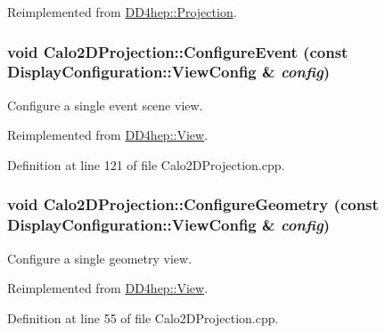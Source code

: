Reimplemented from \hyperlink{class_d_d4hep_1_1_projection_a32d78dc00500fcb000ce25052c96fd62}{DD4hep::Projection}.\hypertarget{class_d_d4hep_1_1_calo2_d_projection_ab49fa4071160750bd2c82e68b2f6d524}{
\subsubsection[{ConfigureEvent}]{\setlength{\rightskip}{0pt plus 5cm}void Calo2DProjection::ConfigureEvent (const {\bf DisplayConfiguration::ViewConfig} \& {\em config})}}
\label{class_d_d4hep_1_1_calo2_d_projection_ab49fa4071160750bd2c82e68b2f6d524}


Configure a single event scene view. 

Reimplemented from \hyperlink{class_d_d4hep_1_1_view_a655dc004a93ab9caa56ee5a501bf492f}{DD4hep::View}.

Definition at line 121 of file Calo2DProjection.cpp.\hypertarget{class_d_d4hep_1_1_calo2_d_projection_aabf1a03b64b1baad596aaa9349e3cbea}{
\subsubsection[{ConfigureGeometry}]{\setlength{\rightskip}{0pt plus 5cm}void Calo2DProjection::ConfigureGeometry (const {\bf DisplayConfiguration::ViewConfig} \& {\em config})}}
\label{class_d_d4hep_1_1_calo2_d_projection_aabf1a03b64b1baad596aaa9349e3cbea}


Configure a single geometry view. 

Reimplemented from \hyperlink{class_d_d4hep_1_1_view_adefb4cb817819ec62803d34b89bf0988}{DD4hep::View}.

Definition at line 55 of file Calo2DProjection.cpp.

